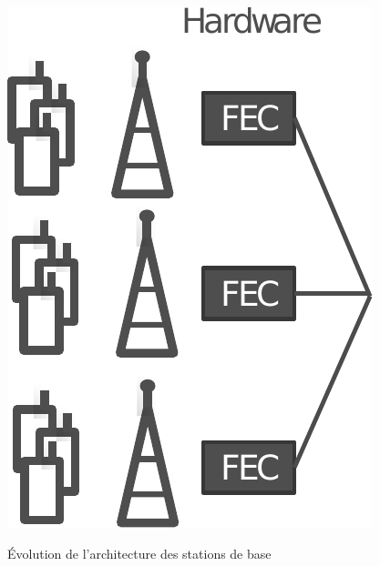 \begin{figure}[t]
{  \includegraphics[scale=0.5]{main/ch2_fig/bs}
  \label{fig:bbu}
  }
  \quad\quad
  \caption{\'Evolution de l'architecture des stations de base}
  \label{fig:bs_evo}
\end{figure}

